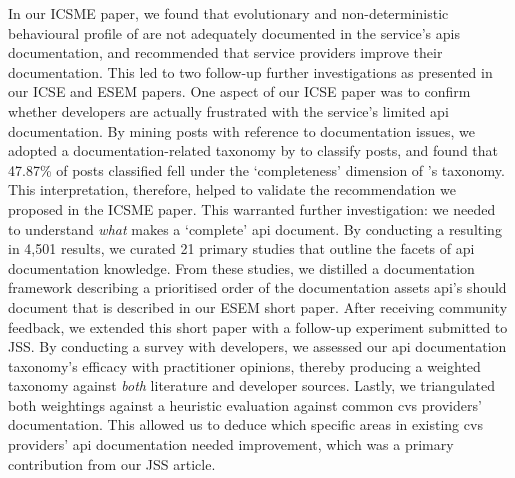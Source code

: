 In our ICSME paper, we found that evolutionary and non-deterministic behavioural profile of are not adequately documented in the service's \glspl{api} documentation, and recommended that service providers improve their documentation. This led to two follow-up further investigations as presented in our ICSE and ESEM papers. One aspect of our ICSE paper was to confirm whether developers are actually frustrated with the service's limited \gls{api} documentation. By mining  posts with reference to documentation issues, we adopted a \citeyear{Aghajani:2019bo} documentation-related taxonomy by \citet{Aghajani:2018et} to classify posts, and found that 47.87\% of posts classified fell under the `completeness' dimension of \citeauthor{Aghajani:2018et}'s taxonomy. This interpretation, therefore, helped to validate the recommendation we proposed in the ICSME paper. This warranted further investigation: we needed to understand \textit{what} makes a `complete' \gls{api} document. By conducting a  resulting in 4,501 results, we curated 21 primary studies that outline the facets of \gls{api} documentation knowledge. From these studies, we distilled a documentation framework describing a prioritised order of the documentation assets \gls{api}'s should document that is described in our ESEM short paper. After receiving community feedback, we extended this short paper with a follow-up experiment submitted to JSS. By conducting a survey with developers, we assessed our \gls{api} documentation taxonomy's efficacy with practitioner opinions, thereby producing a weighted taxonomy against \textit{both} literature and developer sources. Lastly, we triangulated both weightings against a heuristic evaluation against common \gls{cvs} providers' documentation. This allowed us to deduce which specific areas in existing \gls{cvs} providers' \gls{api} documentation needed improvement, which was a primary contribution from our JSS article.

